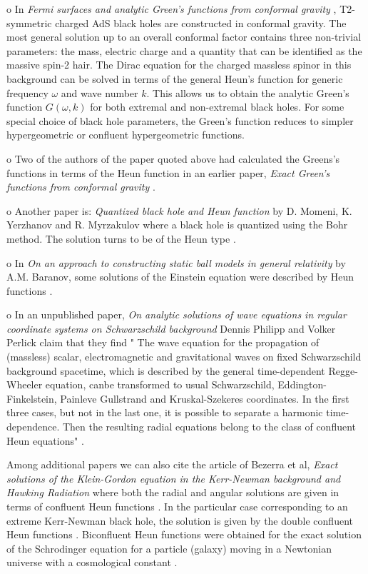 \documentclass{article}
\begin{document}
\noindent o In \emph{Fermi surfaces and analytic Green's functions from
conformal gravity} \cite {Hai}, T2-symmetric charged AdS black
holes are constructed in conformal gravity. The most general
solution up to an overall conformal factor contains three
non-trivial parameters: the mass, electric charge and a quantity
that can be identified as the massive spin-2 hair. The Dirac
equation for the charged massless spinor in this background  can
be solved in terms of the general Heun's function for generic
frequency $\omega$ and wave number $k$. This allows us to obtain
the analytic Green's function $G(\omega, k)$ for both extremal and
non-extremal black holes. For some special choice of black hole
parameters, the Green's function reduces to simpler hypergeometric
or confluent hypergeometric functions.


\noindent o Two of the authors of the paper quoted above had calculated the
Greens's functions in terms of the Heun function in an earlier
paper,  \emph{Exact Green's functions from conformal gravity}
\cite{Lu}.


\noindent o Another paper is:\emph{ Quantized black hole and Heun
function} by D. Momeni, K. Yerzhanov and R. Myrzakulov
\cite{momeni} where a black hole is quantized using the Bohr
method. The solution turns to be of the Heun type .


\noindent o In \emph{On an approach to constructing static ball
models in general relativity} by A.M. Baranov, some solutions of
the Einstein equation were described by Heun functions
\cite{Baranov}.

\noindent o In an unpublished paper, \emph{On analytic solutions of wave equations in regular coordinate systems on
Schwarzschild background}
Dennis Philipp and Volker Perlick claim that they find   " The wave equation for the propagation of (massless) scalar, electromagnetic and gravitational waves on fixed
Schwarzschild background spacetime, which  is described by the general time-dependent Regge-Wheeler equation,
canbe transformed  to usual Schwarzschild, Eddington-Finkelstein, Painleve  Gullstrand
and Kruskal-Szekeres coordinates. In the first three cases, but not in the last one, it is
possible to separate a harmonic time-dependence. Then the resulting radial equations belong to the
class of confluent Heun equations" \cite{Perlick}.


\noindent Among additional papers we can also cite the article of
Bezerra et al, \emph{Exact solutions of the Klein-Gordon equation
in the Kerr-Newman background and Hawking Radiation} where both
the radial and angular solutions are given in terms of confluent
Heun functions \cite{Vieira}. In the particular case corresponding
to an extreme Kerr-Newman black hole, the solution is given by the
double confluent Heun functions \cite{Vieira1}. Biconfluent Heun
functions were obtained for the exact solution of the Schrodinger
equation for a particle (galaxy) moving in a Newtonian universe
with a cosmological constant \cite{Vieira2}.
\end{document}
